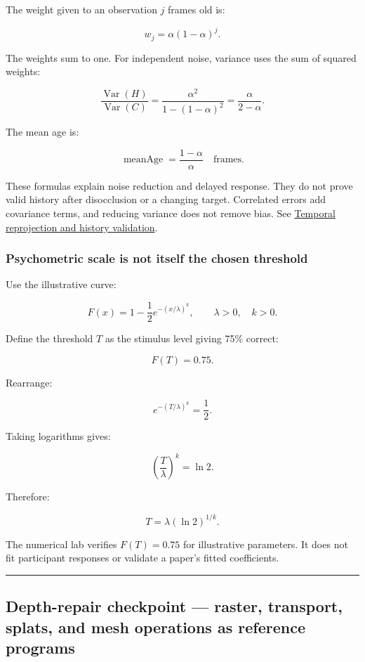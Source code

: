 The weight given to an observation \(j\) frames old is:

\[
w_j=\alpha(1-\alpha)^j.
\]

The weights sum to one. For independent noise, variance uses the sum of squared weights:

\[
\frac{\operatorname{Var}(H)}{\operatorname{Var}(C)}
=\frac{\alpha^2}{1-(1-\alpha)^2}
=\frac{\alpha}{2-\alpha}.
\]

The mean age is:

\[
\operatorname{meanAge}=\frac{1-\alpha}{\alpha}
\quad\text{frames}.
\]

These formulas explain noise reduction and delayed response. They do not prove valid history after disocclusion or a changing target. Correlated errors add covariance terms, and reducing variance does not remove bias. See \hyperref[appendix-0727340a4428]{Temporal reprojection and history validation}.

\subsubsection{Psychometric scale is not itself the chosen threshold}\label{04-visual-computing-ii-ch043-psychometric-scale-is-not-itself-the-chosen-threshold}

Use the illustrative curve:

\[
F(x)=1-\frac12e^{-(x/\lambda)^k},
\qquad \lambda>0,\quad k>0.
\]

Define the threshold \(T\) as the stimulus level giving 75\% correct:

\[
F(T)=0.75.
\]

Rearrange:

\[
e^{-(T/\lambda)^k}=\frac12.
\]

Taking logarithms gives:

\[
\left(\frac{T}{\lambda}\right)^k=\ln2.
\]

Therefore:

\[
T=\lambda(\ln2)^{1/k}.
\]

The numerical lab verifies \(F(T)=0.75\) for illustrative parameters. It does not fit participant responses or validate a paper's fitted coefficients.

\begin{center}\rule{0.5\linewidth}{0.5pt}\end{center}

\subsection{Depth-repair checkpoint --- raster, transport, splats, and mesh operations as reference programs}\label{04-visual-computing-ii-ch043-depth-repair-checkpoint-raster-transport-splats-and-mesh-operations-as-reference-programs}

